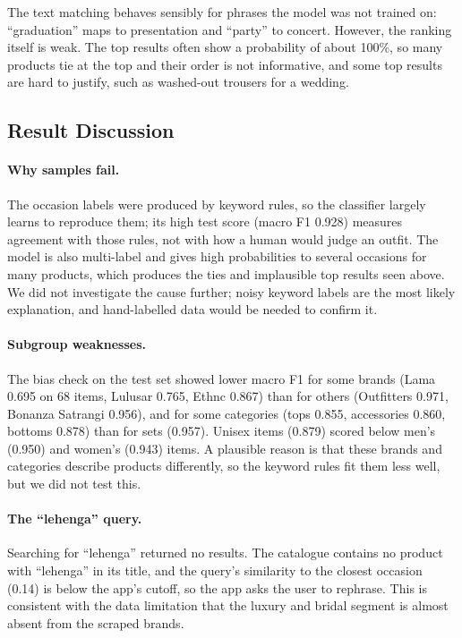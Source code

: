 The text matching behaves sensibly for phrases the model was not trained on: ``graduation'' maps to presentation and ``party'' to concert.
However, the ranking itself is weak. The top results often show a probability of about 100\%, so many products tie at the top and their order is not informative,
and some top results are hard to justify, such as washed-out trousers for a wedding.

\subsection{Result Discussion}
\paragraph{Why samples fail.} The occasion labels were produced by keyword rules, so the classifier largely learns to reproduce them; its high test score (macro F1 0.928) measures agreement with those rules, not with how a human would judge an outfit.
The model is also multi-label and gives high probabilities to several occasions for many products, which produces the ties and implausible top results seen above.
We did not investigate the cause further; noisy keyword labels are the most likely explanation, and hand-labelled data would be needed to confirm it.

\paragraph{Subgroup weaknesses.} The bias check on the test set showed lower macro F1 for some brands (Lama 0.695 on 68 items, Lulusar 0.765, Ethnc 0.867) than for others (Outfitters 0.971, Bonanza Satrangi 0.956),
and for some categories (tops 0.855, accessories 0.860, bottoms 0.878) than for sets (0.957). Unisex items (0.879) scored below men's (0.950) and women's (0.943) items.
A plausible reason is that these brands and categories describe products differently, so the keyword rules fit them less well, but we did not test this.

\paragraph{The ``lehenga'' query.} Searching for ``lehenga'' returned no results. The catalogue contains no product with ``lehenga'' in its title, and the query's similarity to the closest occasion (0.14) is below the app's cutoff, so the app asks the user to rephrase.
This is consistent with the data limitation that the luxury and bridal segment is almost absent from the scraped brands.

